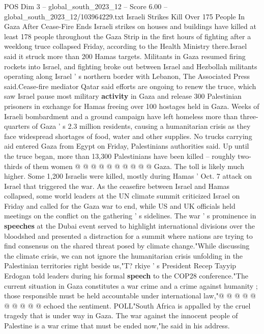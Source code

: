 \begin{textsample}{POS Dim 3 – global\_south\_2023\_12 – Score 6.00 – global\_south\_2023\_12/103964229.txt}  \label{ex:f3_pos_447}
Israeli Strikes Kill Over 175 People In Gaza After Cease-Fire Ends Israeli strikes on houses and buildings have killed at least 178 people throughout the Gaza Strip in the first hours of fighting after a weeklong truce collapsed Friday, according to the Health Ministry there.Israel said it struck more than 200 Hamas targets.
Militants in Gaza resumed firing rockets into Israel, and fighting broke out between Israel and Hezbollah militants operating along Israel ' s northern border with Lebanon, The Associated Press said.Cease-fire mediator Qatar said efforts are ongoing to renew the truce, which saw Israel pause most military \textbf{activity} in Gaza and release 300 Palestinian prisoners in exchange for Hamas freeing over 100 hostages held in Gaza.
Weeks of Israeli bombardment and a ground campaign have left homeless more than three-quarters of Gaza ' s 2.3 million residents, causing a humanitarian crisis as they face widespread shortages of food, water and other supplies.
No trucks carrying aid entered Gaza from Egypt on Friday, Palestinians authorities said.
Up until the truce began, more than 13,300 Palestinians have been killed -- roughly two-thirds of them women @ @ @ @ @ @ @ @ @ @ Gaza.
The toll is likely much higher.
Some 1,200 Israelis were killed, mostly during Hamas ' Oct. 7 attack on Israel that triggered the war.
As the ceasefire between Israel and Hamas collapsed, some world leaders at the UN climate summit criticized Israel on Friday and called for the Gaza war to end, while US and UK officials held meetings on the conflict on the gathering ' s sidelines.
The war ' s prominence in \textbf{speeches} at the Dubai event served to highlight international divisions over the bloodshed and presented a distraction for a summit where nations are trying to find consensus on the shared threat posed by climate change."While discussing the climate crisis, we can not ignore the humanitarian crisis unfolding in the Palestinian territories right beside us,"T? rkiye ' s President Recep Tayyip Erdogan told leaders during his formal \textbf{speech} to the COP28 conference."The current situation in Gaza constitutes a war crime and a crime against humanity ; those responsible must be held accountable under international law,"@ @ @ @ @ @ @ @ @ @ echoed the sentiment.
POLL"South Africa is appalled by the cruel tragedy that is under way in Gaza.
The war against the innocent people of Palestine is a war crime that must be ended now,"he said in his address.

\end{textsample}
